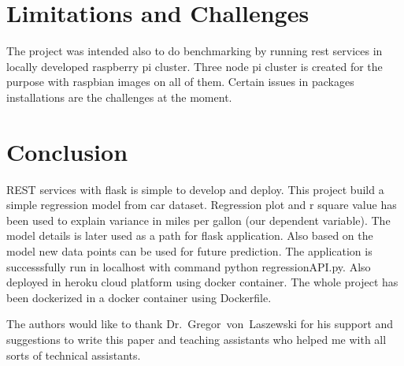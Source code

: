 \section{Limitations and Challenges}
 
The project was intended also to do benchmarking by running rest services in
locally developed raspberry pi cluster. Three node pi cluster is created 
for the purpose with raspbian images on all of them. Certain issues in packages 
installations are the challenges at the moment.

\section{Conclusion}

REST services with flask is simple to develop and deploy. 
This project build a
simple regression model from car dataset. Regression plot and r square
value has been used to explain variance in miles per gallon (our dependent
variable). The model details is later used as 
a path for flask application. Also based on the model new data points can be 
used for future prediction. The application is successsfully run in localhost
with command python regressionAPI.py. Also deployed in heroku cloud platform 
using docker container. The whole project has been dockerized in
a docker container using Dockerfile. 




\begin{acks}

  The authors would like to thank Dr.~Gregor~von~Laszewski for his
  support and suggestions to write this paper and teaching assistants who
  helped me with all sorts of technical assistants.

\end{acks}




 
